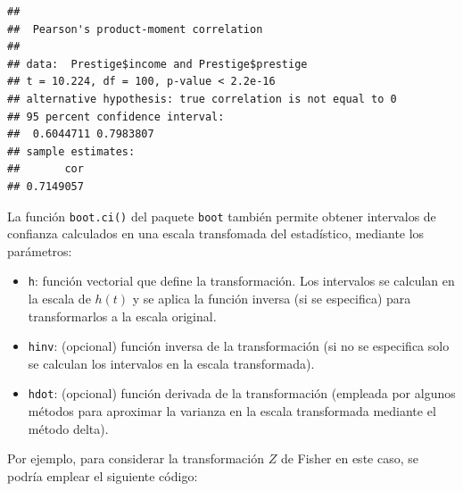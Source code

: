 \documentclass[
]{book}
\theoremstyle{break}
\theoremstyle{nonumberplain}
\begin{document}
\begin{verbatim}
## 
##  Pearson's product-moment correlation
## 
## data:  Prestige$income and Prestige$prestige
## t = 10.224, df = 100, p-value < 2.2e-16
## alternative hypothesis: true correlation is not equal to 0
## 95 percent confidence interval:
##  0.6044711 0.7983807
## sample estimates:
##       cor 
## 0.7149057
\end{verbatim}

La función \texttt{boot.ci()} del paquete \texttt{boot} también permite obtener intervalos de confianza calculados en una escala transfomada del estadístico,
mediante los parámetros:

\begin{itemize}
\item
  \texttt{h}: función vectorial que define la transformación.
  Los intervalos se calculan en la escala de \(h(t)\) y se aplica la función inversa (si se especifica) para transformarlos a la escala original.
\item
  \texttt{hinv}: (opcional) función inversa de la transformación
  (si no se especifica solo se calculan los intervalos en la escala transformada).
\item
  \texttt{hdot}: (opcional) función derivada de la transformación
  (empleada por algunos métodos para aproximar la varianza en la escala transformada mediante el método delta).
\end{itemize}

Por ejemplo, para considerar la transformación \(Z\) de Fisher en este caso, se podría emplear el siguiente código:
\end{document}
